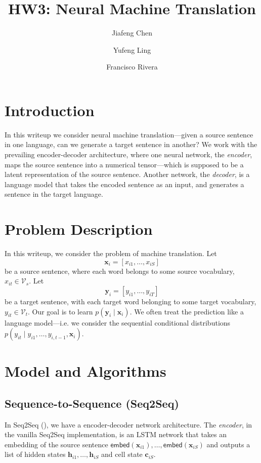 \documentclass[12pt]{article}
\title{HW3: Neural Machine Translation}
\author{Jiafeng Chen \and Yufeng Ling \and
Francisco Rivera}
\newcommand{\sts}{Seq2Seq}
\newcommand{\embed}{\mathsf{embed}}
\begin{document}
\maketitle

\section{Introduction}
In this writeup we consider neural machine translation---given a source sentence in one language, can we generate a target sentence in another? We work with the prevailing encoder-decoder architecture, where one neural network, the \emph{encoder}, maps the source sentence into a numerical tensor---which is supposed to be a latent representation of the source sentence. Another network, the \emph{decoder}, is a language model that takes the encoded sentence as an input, and generates a sentence in the target language. 

\section{Problem Description}
In this writeup, we consider the problem of machine translation. Let 
\begin{equation}
	\bm x_i = [x_{i1},\ldots,x_{iS}]
\end{equation}
be a source sentence, where each word belongs to some source vocabulary, $x_{it} \in \mathcal V_s$. Let 
\begin{equation}
	\bm y_i = [y_{i1},\ldots,y_{iT}]
\end{equation}
be a target sentence, with each target word belonging to some target vocabulary, $y_{it} \in \mathcal V_t$. Our goal is to learn $p(\bm y_i \mid \bm x_i)$. We often treat the prediction like a language model---i.e. we consider the sequential conditional distributions $p(y_{it} \mid y_{i1},\ldots,y_{i,t-1}, \bm x_i)$.


\section{Model and Algorithms}

\subsection{Sequence-to-Sequence (\sts)}
\label{sub:seq2seq}
In \sts{} (\cite{sutskever2014sequence}), we have a encoder-decoder network architecture. The \emph{encoder}, in the vanilla \sts{} implementation, is an LSTM network that takes an embedding of the source sentence $\embed(\bm x_{i1}),\ldots,\embed(\bm x_{iS})$ and outputs a list of hidden states $\bm h_{i1},\ldots, \bm h_{iS}$ and cell state $\bm c_{iS}$.
\end{document}
